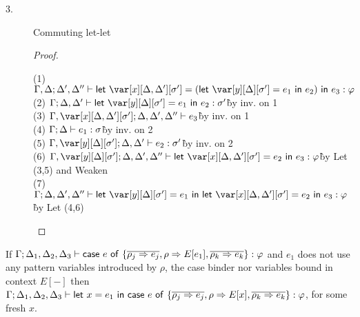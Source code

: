 \begin{description}
\item[3.] Commuting let-let
\begin{proof}~
\begin{tabbing}
    (1) $\G, \D;\D',\D'' \vdash \llet{\x[\D,\D'][\s'] = (\llet{\yD = e_1}{e_2})}{e_3} : \vp$\\
    (2) $\G; \D, \D' \vdash \llet{\yD = e_1}{e_2} : \s'$\`by inv. on 1\\
    (3) $\G, \x[\D,\D'][\s'];\D,\D',\D'' \vdash e_3$\`by inv. on 1\\
    (4) $\Gamma; \Delta \vdash e_1 : \sigma$\`by inv. on 2\\
    (5) $\G, \yD; \D,\D' \vdash e_2 : \s'$\`by inv. on 2\\
    (6) $\G, \yD; \D,\D',\D'' \vdash \llet{\x[\D,\D'][\s'] = e_2}{e_3} : \vp$\`by Let (3,5) and Weaken\\
    (7) $\G; \D,\D',\D'' \vdash \llet{\yD = e_1}{\llet{\x[\D,\D'][\s'] = e_2}{e_3}} : \vp$\`by Let (4,6)\\
\end{tabbing}
\end{proof}
\end{description}




\begin{theorem}
If $\Gamma; \Delta_1,\Delta_2,\Delta_3 \vdash \mathsf{case}~e~\mathsf{of}~\{\overline{\rho_j\Rightarrow e_j}, \rho \Rightarrow
  E[e_1], \overline{\rho_k\Rightarrow e_k}\}  : \varphi$ and $e_1$ does not
use any pattern variables introduced by $\rho$, the case binder nor variables bound in
context $E[{-}]$
then 
$\Gamma ; \Delta_1,\Delta_2,\Delta_3  \vdash \mathsf{let}~x = e_1~\mathsf{in}~\mathsf{case}~e~\mathsf{of}~\{\overline{\rho_j\Rightarrow
           e_j}, \rho \Rightarrow E[x], \overline{\rho_k\Rightarrow e_k}\} : \varphi$,
     for some fresh $x$.
              
   \end{theorem}
   
